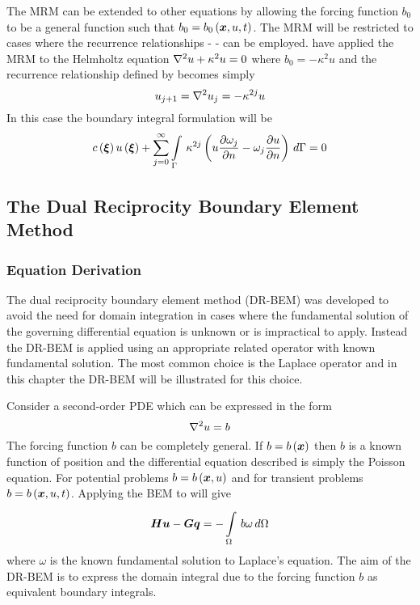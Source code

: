 The MRM can be extended to other equations by allowing the forcing function
$b_{0}$ to be a general function such that $b_{0} = \fnof{b_{0}}{\vect{x},u,t}$.
The MRM will be restricted to cases where the recurrence relationships -
 - can be employed.  
have applied the MRM to the Helmholtz equation $\nabla^{2} {u} + \kappa^{2} u =
0$ where $b_{0} = -\kappa^{2} u$ and the recurrence relationship defined by
 becomes simply 
\begin{equation}
  u_{j+1} = \nabla^{2} {u_{j}} = - \kappa^{2j} u
\end{equation}
In this case the boundary integral formulation will be
\begin{equation}
  \fnof{c}{\vect{\xi}} \fnof{u}{\vect{\xi}} + \dsuml{j=0}{\infty}
  \goneint{\kappa^{2j} \pbrac{u \delby{\omega_{j}}{n} -
    \omega_{j} \delby{u}{n}}}{\Gamma} = 0
\end{equation}

\subsection{The Dual Reciprocity Boundary Element Method}

\subsubsection{Equation Derivation}

The dual reciprocity boundary element method (DR-BEM) was developed to
avoid the need for domain integration in cases where the fundamental
solution of the governing differential equation is unknown or is
impractical to apply.  Instead the DR-BEM is applied using an appropriate
related operator with known fundamental solution.  The most common choice
is the Laplace operator \cite{partridge:1992} and in this chapter the DR-BEM
will be illustrated for this choice.

Consider a second-order PDE which can be expressed in the form
\begin{equation}
  \nabla^{2} {u} = b
\label{eq:drmbase}
\end{equation}
The forcing function $b$ can be completely general. If $b = \fnof{b}{\vect{x}}$
then $b$ is a known function of position and the differential equation
described is simply the Poisson equation. For potential problems $b =
\fnof{b}{\vect{x},u}$ and for transient problems $b = \fnof{b}{\vect{x},u,t}$.
Applying the BEM to  will give
\begin{equation}
  \matr{H} \vect{u} - \matr{G} \vect{q} = -\goneint{b \omega}{\Omega}
\end{equation}
where $\omega$ is the known fundamental solution to Laplace's equation.
The aim of the DR-BEM is to express the domain integral due to the forcing
function $b$ as equivalent boundary integrals.

